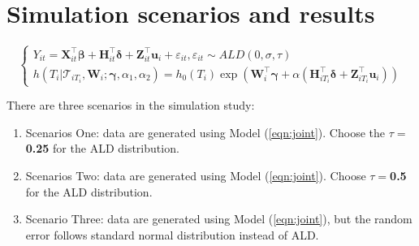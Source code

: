 \documentclass{article}
\begin{document}
\section{Simulation scenarios and results}

\begin{equation}\label{eqn:joint}
\left\{
\begin{array}{l}
Y_{it} = {\boldsymbol X}_{it}^{\top}\boldsymbol{\beta} + {\boldsymbol H}_{it}^{\top}\boldsymbol{\delta} + {\boldsymbol Z}_{it}^{\top}{\boldsymbol u}_i + \varepsilon_{it}, \varepsilon_{it}\sim ALD(0, \sigma,\tau)\\
h(T_i|\mathcal{T}_{iT_i}, {\boldsymbol W}_i;  \boldsymbol{\gamma}, \alpha_1,
\alpha_2) = h_0(T_i)\exp({\boldsymbol W}_i^{\top}\boldsymbol{\gamma} + \alpha({\boldsymbol H}_{iT_i}^{\top}\boldsymbol{\delta} + {\boldsymbol Z}_{iT_i}^{\top}{\boldsymbol u}_{i}))
\end{array}
\right.
\end{equation}


There are three scenarios in the simulation study:
\begin{enumerate}
\item Scenarios One: data are generated using Model (\ref{eqn:joint}). Choose the $\tau=$ {\bf 0.25} for the ALD distribution.
\item Scenarios Two: data are generated using Model (\ref{eqn:joint}). Choose $\tau= ${\bf 0.5} for the ALD distribution.
\item Scenario Three: data are generated using Model (\ref{eqn:joint}), but the random error follows standard normal distribution instead of ALD.
\end{enumerate}
\end{document}

